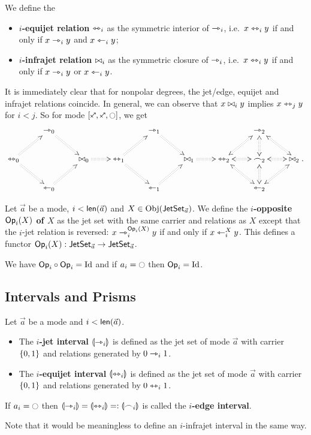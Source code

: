 \documentclass[a4paper]{article}
\begin{document}
\begin{definition}
	We define the
	\begin{itemize}
		\item \textbf{$i$-equijet relation} $\leftrightarrowtriangle_i$ as the symmetric interior of $\rightarrowtriangle_i$, i.e.\ $x \leftrightarrowtriangle_i y$ if and only if $x \rightarrowtriangle_i y$ and $x \leftarrowtriangle_i y$;
		\item \textbf{$i$-infrajet relation} $\mathrel{\bowtie}_i$ as the symmetric closure of $\rightarrowtriangle_i$, i.e.\ $x \leftrightarrowtriangle_i y$ if and only if $x \rightarrowtriangle_i y$ or $x \leftarrowtriangle_i y$.
	\end{itemize}
\end{definition}
It is immediately clear that for nonpolar degrees, the jet/edge, equijet and infrajet relations coincide.
In general, we can observe that $x \mathrel{\bowtie}_i y$ implies $x \leftrightarrowtriangle_j y$ for $i < j$.
So for mode $[\ypolar, \ypolar, \npolar]$, we get
\[
\xymatrix{
	& 
	\jet_0
		\ar@{:>}[rd]
	&&& 
	\jet_1 
		\ar@{:>}[rd]
	&&& 
	\jet_2 
		\ar@{<:>}[rd]
	\\
	\equijet_0
		\ar@{:>}[ru]
		\ar@{:>}[rd]
	&&
	\infrajet_0
		\ar@{:>}[r]
	&
	\equijet_1
		\ar@{:>}[ru]
		\ar@{:>}[rd]
	&&
	\infrajet_1
		\ar@{:>}[r]
	&
	\equijet_2
		\ar@{<:>}[ru]
		\ar@{<:>}[rd]
	&
	\edge_2
		\ar@{<:>}[l]
		\ar@{<:>}[u]
		\ar@{<:>}[r]
		\ar@{<:>}[d]
	&
	\infrajet_2.
	\\
	& 
	\tej_0 
		\ar@{:>}[ru]
	&&& 
	\tej_1 
		\ar@{:>}[ru]
	&&& 
	\tej_2 
		\ar@{<:>}[ru]
}
\]

\begin{definition}
	Let $\vec a$ be a mode, $i < \mathsf{len}(\vec a)$ and $X \in \mathrm{Obj}(\mathsf{JetSet}_{\vec a})$.
	We define the \textbf{$i$-opposite ${\mathsf{Op}}_i(X)$ of $X$} as the jet set with the same carrier and relations as $X$ except that the $i$-jet relation is reversed: $x \rightarrowtriangle_i^{{\mathsf{Op}}_i(X)} y$ if and only if $x \leftarrowtriangle_i^X y$.
	This defines a functor ${\mathsf{Op}}_i(X) : \mathsf{JetSet}_{\vec a} \to \mathsf{JetSet}_{\vec a}$.
\end{definition}
We have ${\mathsf{Op}}_i \circ {\mathsf{Op}}_i = \mathrm{Id}$ and if $a_i = \npolar$ then ${\mathsf{Op}}_i = \mathrm{Id}$.

\subsection{Intervals and Prisms}
\begin{definition} \label{def:interval}
	Let $\vec a$ be a mode and $i < \mathsf{len}(\vec a)$.
	\begin{itemize}
		\item The \textbf{$i$-jet interval} ${\llparenthesis \rightarrowtriangle_i \rrparenthesis}$ is defined as the jet set of mode $\vec a$ with carrier $\mathopen{}\left\{ 0, 1 \right\}\mathclose{}$ and relations generated by $0 \rightarrowtriangle_i 1$.
		\item The \textbf{$i$-equijet interval} ${\llparenthesis \leftrightarrowtriangle_i \rrparenthesis}$ is defined as the jet set of mode $\vec a$ with carrier $\mathopen{}\left\{ 0, 1 \right\}\mathclose{}$ and relations generated by $0 \leftrightarrowtriangle_i 1$.
	\end{itemize}
	If $a_i = \npolar$ then ${\llparenthesis \rightarrowtriangle_i \rrparenthesis} = {\llparenthesis \leftrightarrowtriangle_i \rrparenthesis} =: {\llparenthesis \frown_i \rrparenthesis}$ is called the \textbf{$i$-edge interval}.
\end{definition}
Note that it would be meaningless to define an $i$-infrajet interval in the same way.
\end{document}
